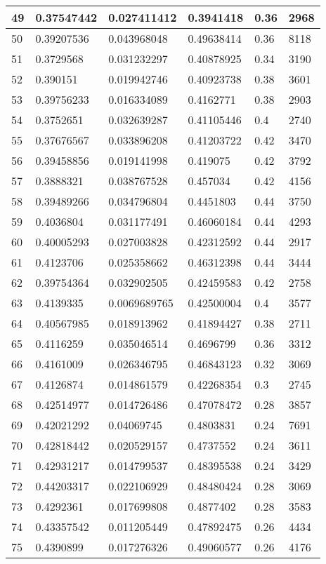 \begin{longtable}{|l|l|l|l|l|l|}
49 & 0.37547442 & 0.027411412 & 0.3941418 & 0.36 & 2968 \\ \hline 
50 & 0.39207536 & 0.043968048 & 0.49638414 & 0.36 & 8118 \\ \hline 
51 & 0.3729568 & 0.031232297 & 0.40878925 & 0.34 & 3190 \\ \hline 
52 & 0.390151 & 0.019942746 & 0.40923738 & 0.38 & 3601 \\ \hline 
53 & 0.39756233 & 0.016334089 & 0.4162771 & 0.38 & 2903 \\ \hline 
54 & 0.3752651 & 0.032639287 & 0.41105446 & 0.4 & 2740 \\ \hline 
55 & 0.37676567 & 0.033896208 & 0.41203722 & 0.42 & 3470 \\ \hline 
56 & 0.39458856 & 0.019141998 & 0.419075 & 0.42 & 3792 \\ \hline 
57 & 0.3888321 & 0.038767528 & 0.457034 & 0.42 & 4156 \\ \hline 
58 & 0.39489266 & 0.034796804 & 0.4451803 & 0.44 & 3750 \\ \hline 
59 & 0.4036804 & 0.031177491 & 0.46060184 & 0.44 & 4293 \\ \hline 
60 & 0.40005293 & 0.027003828 & 0.42312592 & 0.44 & 2917 \\ \hline 
61 & 0.4123706 & 0.025358662 & 0.46312398 & 0.44 & 3444 \\ \hline 
62 & 0.39754364 & 0.032902505 & 0.42459583 & 0.42 & 2758 \\ \hline 
63 & 0.4139335 & 0.0069689765 & 0.42500004 & 0.4 & 3577 \\ \hline 
64 & 0.40567985 & 0.018913962 & 0.41894427 & 0.38 & 2711 \\ \hline 
65 & 0.4116259 & 0.035046514 & 0.4696799 & 0.36 & 3312 \\ \hline 
66 & 0.4161009 & 0.026346795 & 0.46843123 & 0.32 & 3069 \\ \hline 
67 & 0.4126874 & 0.014861579 & 0.42268354 & 0.3 & 2745 \\ \hline 
68 & 0.42514977 & 0.014726486 & 0.47078472 & 0.28 & 3857 \\ \hline 
69 & 0.42021292 & 0.04069745 & 0.4803831 & 0.24 & 7691 \\ \hline 
70 & 0.42818442 & 0.020529157 & 0.4737552 & 0.24 & 3611 \\ \hline 
71 & 0.42931217 & 0.014799537 & 0.48395538 & 0.24 & 3429 \\ \hline 
72 & 0.44203317 & 0.022106929 & 0.48480424 & 0.28 & 3069 \\ \hline 
73 & 0.4292361 & 0.017699808 & 0.4877402 & 0.28 & 3583 \\ \hline 
74 & 0.43357542 & 0.011205449 & 0.47892475 & 0.26 & 4434 \\ \hline 
75 & 0.4390899 & 0.017276326 & 0.49060577 & 0.26 & 4176 \\ \hline 
\end{longtable}